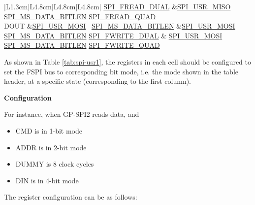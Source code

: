 \documentclass[main\_\_EN.tex]{subfiles}
\begin{document}
\begin{longtable}[c]{ |L{1.3cm}|L{4.8cm}|L{4.8cm}|L{4.8cm}| }
     \hyperref[fielddesc:SPIFREADDUAL]{SPI\_FREAD\_DUAL}
     &\hyperref[fielddesc:SPIUSRMISO]{SPI\_USR\_MISO}
     \hyperref[fielddesc:SPIMSDATABITLEN]{SPI\_MS\_DATA\_BITLEN}
     \hyperref[fielddesc:SPIFREADQUAD]{SPI\_FREAD\_QUAD}\\
     \hline
DOUT &\hyperref[fielddesc:SPIUSRMOSI]{SPI\_USR\_MOSI}       \
      \hyperref[fielddesc:SPIMSDATABITLEN]{SPI\_MS\_DATA\_BITLEN}
     &\hyperref[fielddesc:SPIUSRMOSI]{SPI\_USR\_MOSI}
     \hyperref[fielddesc:SPIMSDATABITLEN]{SPI\_MS\_DATA\_BITLEN}       \hyperref[fielddesc:SPIFWRITEDUAL]{SPI\_FWRITE\_DUAL} &
     \hyperref[fielddesc:SPIUSRMOSI]{SPI\_USR\_MOSI}
     \hyperref[fielddesc:SPIMSDATABITLEN]{SPI\_MS\_DATA\_BITLEN}       \hyperref[fielddesc:SPIFWRITEQUAD]{SPI\_FWRITE\_QUAD} \\
     \hline
\end{longtable}

As shown in Table \ref{tab:spi-usr1}, the registers in each cell should be configured to set the FSPI bus to corresponding bit mode, i.e. the mode shown in the table header, at a specific state (corresponding to the first column).

\textbf{Configuration}

For instance, when GP-SPI2 reads data, and
\begin{itemize}
    \item CMD is in 1-bit mode
    \item ADDR is in 2-bit mode
    \item DUMMY is 8 clock cycles
    \item DIN is in 4-bit mode
\end{itemize}
The register configuration can be as follows:
\end{document}
